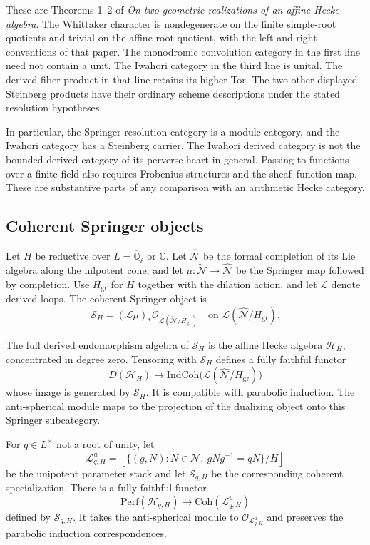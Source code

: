 These are Theorems 1--2 of
\emph{On two geometric realizations of an affine Hecke algebra}.
The Whittaker character is nondegenerate on the finite simple-root
quotients and trivial on the affine-root quotient, with the left
and right conventions of that paper.
The monodromic convolution category in the first line need not
contain a unit. The Iwahori category in the third line is unital.
The derived fiber product in that line retains its higher Tor.
The two other displayed Steinberg products have their ordinary
scheme descriptions under the stated resolution hypotheses.

In particular, the Springer-resolution category is a module category,
and the Iwahori category has a Steinberg carrier.
The Iwahori derived category is not the bounded derived category of
its perverse heart in general.
Passing to functions over a finite field also requires Frobenius
structures and the sheaf--function map.
These are substantive parts of any comparison with an arithmetic
Hecke category.

\subsection{Coherent Springer objects}

Let \(H\) be reductive over \(L=\overline{\mathbb Q}_\ell\) or
\(\mathbb C\).
Let \(\widehat{\mathcal N}\) be the formal completion of its Lie
algebra along the nilpotent cone, and let
\(\mu:\widetilde{\mathcal N}\to\widehat{\mathcal N}\) be the
Springer map followed by completion.
Use \(H_{\mathrm{gr}}\) for \(H\) together with the dilation action,
and let \(\mathcal L\) denote derived loops.
The coherent Springer object is
\[
 \mathcal S_H=
 (\mathcal L\mu)_*
 \mathcal O_{\mathcal L(\widetilde{\mathcal N}/H_{\mathrm{gr}})}
 \quad\text{on }\mathcal L(\widehat{\mathcal N}/H_{\mathrm{gr}}).
\]

\begin{theorem}
\label{v4-arith:ic:coherent-springer}
The full derived endomorphism algebra of \(\mathcal S_H\)
is the affine Hecke algebra \(\mathcal H_H\), concentrated
in degree zero.
Tensoring with \(\mathcal S_H\) defines a fully faithful functor
\[
 D(\mathcal H_H)\longrightarrow
 \mathrm{IndCoh}\bigl(\mathcal L(\widehat{\mathcal N}/H_{\mathrm{gr}})\bigr)
\]
whose image is generated by \(\mathcal S_H\).
It is compatible with parabolic induction.
The anti-spherical module maps to the projection of the dualizing
object onto this Springer subcategory.

For \(q\in L^\times\) not a root of unity, let
\[
 \mathcal L^u_{q,H}
   =[\{(g,N):N\in\mathcal N,\ gNg^{-1}=qN\}/H]
\]
be the unipotent parameter stack and let \(\mathcal S_{q,H}\)
be the corresponding coherent specialization.
There is a fully faithful functor
\[
 \mathrm{Perf}(\mathcal H_{q,H})\longrightarrow
 \mathrm{Coh}(\mathcal L^u_{q,H})
\]
defined by \(\mathcal S_{q,H}\).
It takes the anti-spherical module to
\(\mathcal O_{\mathcal L^u_{q,H}}\) and preserves the parabolic
induction correspondences.
\end{theorem}

